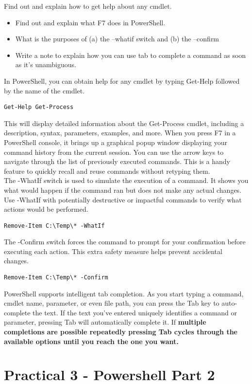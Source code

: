 \documentclass[a4paper]{article}
\begin{document}
\noindent
\textcolor{green!50!black}{
Find out and explain how to get help about any cmdlet.
\begin{itemize}
    \item Find out and explain what F7 does in PowerShell.
    \item  What is the purposes of (a) the –whatif switch and (b) the –confirm
    \item Write a note to explain how you can use tab to complete a command as soon as
    it’s unambiguous.  
\end{itemize}
}
\noindent
In PowerShell, you can obtain help for any cmdlet by typing Get-Help followed by the name of the cmdlet.
\begin{verbatim}
Get-Help Get-Process
\end{verbatim}
This will display detailed information about the Get-Process cmdlet, including a description, syntax, parameters, examples, and more.
When you press F7 in a PowerShell console, it brings up a graphical popup window displaying your command history from the current session.
You can use the arrow keys to navigate through the list of previously executed commands. This is a handy feature to quickly recall and reuse commands without retyping them.
\\
The -WhatIf switch is used to simulate the execution of a command. It shows you what would happen if the command ran but does not make any actual changes.
Use -WhatIf with potentially destructive or impactful commands to verify what actions would be performed.
\begin{verbatim}
Remove-Item C:\Temp\* -WhatIf
\end{verbatim}
The -Confirm switch forces the command to prompt for your confirmation before executing each action. This extra safety measure helps prevent accidental changes.
\begin{verbatim}
Remove-Item C:\Temp\* -Confirm
\end{verbatim}
\noindent
PowerShell supports intelligent tab completion. As you start typing a command, cmdlet name, parameter, or even file path, you can press the Tab key to auto-complete the text.
If the text you've entered uniquely identifies a command or parameter, pressing Tab will automatically complete it.
If \textbf{multiple completions are possible repeatedly pressing Tab cycles through the available options until you reach the one you want.}


\section{Practical 3 -  Powershell Part 2}
\end{document}
